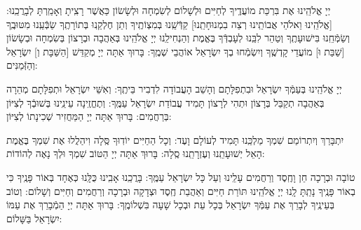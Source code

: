 \documentclass[twoside, openany, parskip=half, 11pt]{book}
\begin{document}
	 יְיָ אֱלֹהֵֽינוּ אֶת בִּרְכַּת מוֹעֲדֶֽיךָ לְחַיִּים וּלְשָׁלוֹם לְשִׂמְחָה וּלְשָׂשׂוֹן כַּאֲשֶׁר רָצִֽיתָ וְאָמַֽרְתָּ לְבָרֲכֵֽנוּ: [\shabbos אֱלֹהֵֽינוּ וֵאלֹהֵי אֲבוֹתֵֽינוּ רְצֵה בִמְנוּחָתֵֽנוּ] קַדְּֿשֵֽׁנוּ בְּמִצְוֹתֶֽיךָ וְתֵן חֶלְקֵֽנוּ בְּתוֹרָתֶֽךָ שַׂבְּֿעֵֽנוּ מִטּוּבֶֽךָ וְשַׂמְּֿחֵֽנוּ בִּישׁוּעָתֶֽךָ וְטַהֵר לִבֵּֽנוּ לְעָבְדְּֿךָ בֶּאֱמֶת וְהַנְחִילֵֽנוּ יְיָ אֱלֹהֵֽינוּ בְּאַהֲבָה וּבְרָצוֹן בְּשִׂמְחָה וּבְשָׂשׂוֹן [\shabbos שַׁבַּת וּ] מוֹעֲדֵי קָדְשֶֽׁךָ וְיִשְׂמְֿחוּ בְךָ יִשְׂרָאֵל אוֹהֲבֵי שְׁמֶֽךָ: בָּרוּךְ אַתָּה יְיָ מְקַדֵּשׁ
[\shabbos הַשַּׁבָּת וְ] יִשְׂרָאֵל וְהַזְּֿמַנִּים:
	
	
 יְיָ אֱלֹהֵֽינוּ בְּעַמְּֿךָ יִשְׂרָאֵל וּבִתְפִלָּתָם וְהָשֵׁב הָעֲבוֹדָה לִדְבִיר בֵּיתֶֽךָ: וְאִשֵּׁי יִשְׂרָאֵל וּתְפִלָּתָם מְהֵרָה בְּאַהֲבָה תְקַבֵּל בְּרָצוֹן וּתְהִי לְרָצוֹן תָּמִיד עֲבוֹדַת יִשְׂרָאֵל עַמֶּֽךָ: וְתֶחֱזֶֽינָה עֵינֵֽינוּ בְּשׁוּבְֿךָ לְצִיּוֹן בְּרַחֲמִים: בָּרוּךְ אַתָּה יְיָ הַמַּחֲזִיר שְׁכִינָתוֹ לְצִיּוֹן:

\modim


\clearpage

\vspace{-\baselineskip}
 יִתְבָּרַךְ וְיִתְרוֹמַם שִׁמְךָ מַלְכֵּֽנוּ תָּמִיד לְעוֹלָם וָעֶד: וְכָל הַחַיִּים יוֹדֽוּךָ סֶּֽלָה וִיהַלֲלוּ אֶת שִׁמְךָ בֶּאֱמֶת הָאֵל יְשׁוּעָתֵֽנוּ וְעֶזְרָתֵֽנוּ סֶֽלָה: בָּרוּךְ אַתָּה יְיָ הַטּוֹב שִׁמְךָ וּלְךָ נָאֶה לְהוֹדוֹת:



 טוֹבָה וּבְרָכָה חֵן וָחֶֽסֶד וְרַחֲמִים עָלֵֽינוּ וְעַל כָּל יִשְׂרָאֵל עַמֶּֽךָ: בָּרֲכֵֽנוּ אָבִֽינוּ כֻּלָּֽנוּ כְּאֶחָד בְּאוֹר פָּנֶֽיךָ כִּי בְאוֹר פָּנֶֽיךָ נָתַֽתָּ לָֽנוּ יְיָ אֱלֹהֵֽינוּ תּוֹרַת חַיִּים וְאַהֲבַת חֶֽסֶד וּצְדָקָה וּבְרָכָה וְרַחֲמִים וְחַיִּים וְשָׁלוֹם: וְטוֹב בְּעֵינֶֽיךָ לְבָרֵךְ אֶת עַמְּֿךָ יִשְׂרָאֵל בְּכָל עֵת וּבְכָל שָׁעָה בִּשְׁלוֹמֶֽךָ: בָּרוּךְ אַתָּה יְיָ הַמְֿבָרֵךְ אֶת עַמּוֹ יִשְׂרָאֵל בַּשָּׁלוֹם:

\tachanunim

\vfill


 \\

\sepline 
 
 \\
 \\
\end{document}
